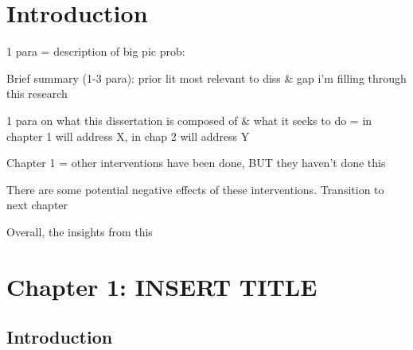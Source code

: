 \documentclass[a4paper, nobind]{templates/ociamthesis}
\begin{document}
\begin{romanpages}
\listoffigures
	\mtcaddchapter

\listoftables
  \mtcaddchapter

\end{romanpages}

\flushbottom

\hypertarget{introduction}{%
\chapter*{Introduction}\label{introduction}}

\adjustmtc
{}

1 para = description of big pic prob:

Brief summary (1-3 para): prior lit most relevant to diss \& gap i'm filling through this research

1 para on what this dissertation is composed of \& what it seeks to do = in chapter 1 will address X, in chap 2 will address Y

Chapter 1 = other interventions have been done, BUT they haven't done this

There are some potential negative effects of these interventions. Transition to next chapter

Overall, the insights from this

\hypertarget{chapter-1-insert-title}{%
\chapter{Chapter 1: INSERT TITLE}\label{chapter-1-insert-title}}

\hypertarget{introduction-1}{%
\section{Introduction}\label{introduction-1}}
\end{document}
